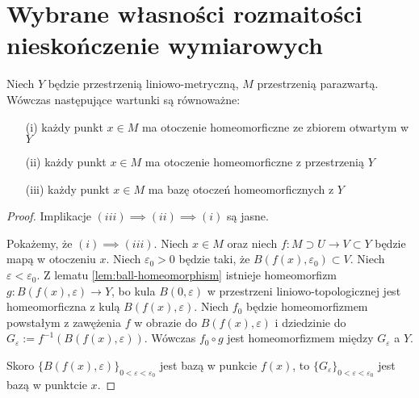 \section{Wybrane własności rozmaitości nieskończenie wymiarowych}

\begin{lem}
  Niech $Y$ będzie przestrzenią liniowo-metryczną, $M$ przestrzenią parazwartą. Wówczas następujące wartunki są równoważne:
  \begin{enumerate}
   \item[(i)] każdy punkt $x \in M$ ma otoczenie homeomorficzne ze zbiorem otwartym w $Y$
   \item[(ii)] każdy punkt $x \in M$ ma otoczenie homeomorficzne z przestrzenią $Y$
   \item[(iii)] każdy punkt $x \in M$ ma bazę otoczeń homeomorficznych z $Y$
  \end{enumerate}

  \begin{proof}
    Implikacje $(iii) \implies (ii) \implies (i)$ są jasne.
    
    Pokażemy, że $(i) \implies (iii)$. Niech $x \in M$ oraz niech $f: M \supset U \to V \subset Y$ będzie mapą w otoczeniu $x$. Niech $\varepsilon_0 > 0$ będzie taki, że $B(f(x), \varepsilon_0) \subset V$. Niech $\varepsilon < \varepsilon_0$. Z lematu \ref{lem:ball-homeomorphism} istnieje homeomorfizm $g: B(f(x), \varepsilon) \to Y$, bo kula $B(0, \varepsilon)$ w przestrzeni liniowo-topologicznej jest homeomorficzna z kulą $B(f(x), \varepsilon)$. Niech $f_0$ będzie homeomorfizmem powstałym z zawężenia $f$ w obrazie do $B(f(x), \varepsilon)$ i dziedzinie do $G_\varepsilon := f^{-1}(B(f(x), \varepsilon))$. Wówczas $f_0 \circ g$ jest homeomorfizmem między $G_\varepsilon$ a $Y$.
    
    Skoro $\{B(f(x), \varepsilon)\}_{0 < \varepsilon < \varepsilon_0}$ jest bazą w punkcie $f(x)$, to $\{G_\varepsilon\}_{0 < \varepsilon < \varepsilon_0}$ jest bazą w punktcie $x$.
  \end{proof}
\end{lem}


